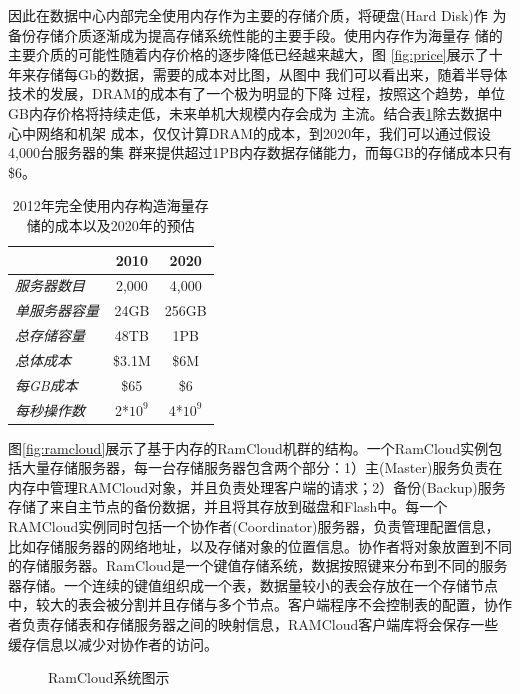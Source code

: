 因此在数据中心内部完全使用内存作为主要的存储介质，将硬盘(Hard Disk)作
为备份存储介质逐渐成为提高存储系统性能的主要手段。使用内存作为海量存
储的主要介质的可能性随着内存价格的逐步降低已经越来越大，图
\ref{fig:price}展示了十年来存储每Gb的数据，需要的成本对比图，从图中
我们可以看出来，随着半导体技术的发展，DRAM的成本有了一个极为明显的下降
过程，按照这个趋势，单位GB内存价格将持续走低，未来单机大规模内存会成为
主流。结合表\ref{table:price2}除去数据中心中网络和机架
成本，仅仅计算DRAM的成本，到2020年，我们可以通过假设4,000台服务器的集
群来提供超过1PB内存数据存储能力，而每GB的存储成本只有\$6。


\begin{table}[]\small
\caption{2012年完全使用内存构造海量存储的成本以及2020年的预估\cite{ousterhout2010case}}
\label{table:price2}
\centering
\begin{tabular}{|p{108pt}|c|c|}
\hline
\textbf{} & \textbf{2010} & \textbf{2020}\\
\hline
\textit{服务器数目}& 2,000 & 4,000\\
\hline
\textit{单服务器容量}  & 24GB & 256GB\\
\hline
\textit{总存储容量} & 48TB & 1PB\\
\hline
 \textit{总体成本} & \$3.1M & \$6M \\
 \hline
\textit{每GB成本} & \$65 & \$6 \\
\hline
\textit{每秒操作数} & 2*$10^9$ & 4*$10^9$\\
\hline
\end{tabular}
\end{table}

图\ref{fig:ramcloud}展示了基于内存的RamCloud机群的结构。一个RamCloud实例包括大量存储服务器，每一台存储服务器包含两个部分：1）主(Master)服务负责在内存中管理RAMCloud对象，并且负责处理客户端的请求；2）备份(Backup)服务存储了来自主节点的备份数据，并且将其存放到磁盘和Flash中。每一个RAMCloud实例同时包括一个协作者(Coordinator)服务器，负责管理配置信息，比如存储服务器的网络地址，以及存储对象的位置信息。协作者将对象放置到不同的存储服务器。RamCloud是一个键值存储系统，数据按照键来分布到不同的服务器存储。一个连续的键值组织成一个表，数据量较小的表会存放在一个存储节点中，较大的表会被分割并且存储与多个节点。客户端程序不会控制表的配置，协作者负责存储表和存储服务器之间的映射信息，RAMCloud客户端库将会保存一些缓存信息以减少对协作者的访问。

\begin{figure}[htbp]
	\centering
	\caption{RamCloud系统图示}
\end{figure}

